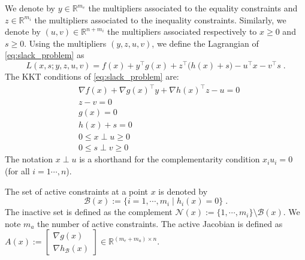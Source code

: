 We denote by $y \in \mathbb{R}^{m_e}$ the multipliers associated
to the equality constraints and $z \in \mathbb{R}^{m_i}$ the multipliers
associated to the inequality constraints. Similarly, we denote
by $(u, v) \in \mathbb{R}^{n + m_i}$ the multipliers associated
respectively to $x \geq 0$ and $s \geq 0$.
Using the multipliers $(y, z, u, v)$, we define the Lagrangian of \eqref{eq:slack_problem} as
\begin{equation}
  \label{eq:lagrangian}
  L(x, s; y, z, u, v) = f(x) + y^\top g(x) + z^\top \big(h(x) +s\big)
  - u^\top x - v^\top s \; .
\end{equation}
The KKT conditions of \eqref{eq:slack_problem} are:
\begin{subequations}
  \label{eq:kktconditions}
    \begin{align}
      & \nabla f(x) + \nabla g(x)^\top y + \nabla h(x)^\top z - u = 0 \\
      & z - v = 0 \\
      & g(x) = 0 \\
      & h(x) + s = 0 \\
      \label{eq:kktconditions:compx}
      & 0 \leq x \perp u \geq 0 \\
      \label{eq:kktconditions:comps}
      & 0 \leq s \perp v \geq 0
    \end{align}
\end{subequations}
The notation $x \perp u$ is a shorthand for the complementarity
condition $x_i u_i = 0$ (for all $i=1\cdots, n$).

The set of active constraints at a point $x$ is denoted by
\begin{equation}
  \mathcal{B}(x) := \{ i = 1, \cdots, m_i \; | \; h_i(x) = 0 \} \; .
\end{equation}
The inactive set is defined as the complement $\mathcal{N}(x) := \{1, \cdots, m_i \} \setminus \mathcal{B}(x)$.
We note $m_a$ the number of active constraints.
The active Jacobian is defined as $A(x) := \begin{bmatrix} \nabla g(x) \\ \nabla h_{\mathcal{B}}(x) \end{bmatrix} \in \mathbb{R}^{(m_e + m_a) \times n}$.

